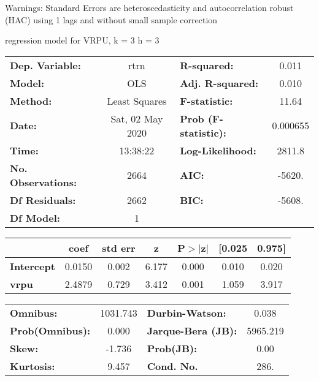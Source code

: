 Warnings: \newline
 [1] Standard Errors are heteroscedasticity and autocorrelation robust (HAC) using 1 lags and without small sample correction\ 

regression model for VRPU, k = 3 h = 3\begin{center}
\begin{tabular}{lclc}
\toprule
\textbf{Dep. Variable:}    &       rtrn       & \textbf{  R-squared:         } &     0.011   \\
\textbf{Model:}            &       OLS        & \textbf{  Adj. R-squared:    } &     0.010   \\
\textbf{Method:}           &  Least Squares   & \textbf{  F-statistic:       } &     11.64   \\
\textbf{Date:}             & Sat, 02 May 2020 & \textbf{  Prob (F-statistic):} &  0.000655   \\
\textbf{Time:}             &     13:38:22     & \textbf{  Log-Likelihood:    } &    2811.8   \\
\textbf{No. Observations:} &        2664      & \textbf{  AIC:               } &    -5620.   \\
\textbf{Df Residuals:}     &        2662      & \textbf{  BIC:               } &    -5608.   \\
\textbf{Df Model:}         &           1      & \textbf{                     } &             \\
\bottomrule
\end{tabular}
\begin{tabular}{lcccccc}
                   & \textbf{coef} & \textbf{std err} & \textbf{z} & \textbf{P$> |$z$|$} & \textbf{[0.025} & \textbf{0.975]}  \\
\midrule
\textbf{Intercept} &       0.0150  &        0.002     &     6.177  &         0.000        &        0.010    &        0.020     \\
\textbf{vrpu}      &       2.4879  &        0.729     &     3.412  &         0.001        &        1.059    &        3.917     \\
\bottomrule
\end{tabular}
\begin{tabular}{lclc}
\textbf{Omnibus:}       & 1031.743 & \textbf{  Durbin-Watson:     } &    0.038  \\
\textbf{Prob(Omnibus):} &   0.000  & \textbf{  Jarque-Bera (JB):  } & 5965.219  \\
\textbf{Skew:}          &  -1.736  & \textbf{  Prob(JB):          } &     0.00  \\
\textbf{Kurtosis:}      &   9.457  & \textbf{  Cond. No.          } &     286.  \\
\bottomrule
\end{tabular}
\end{center}

